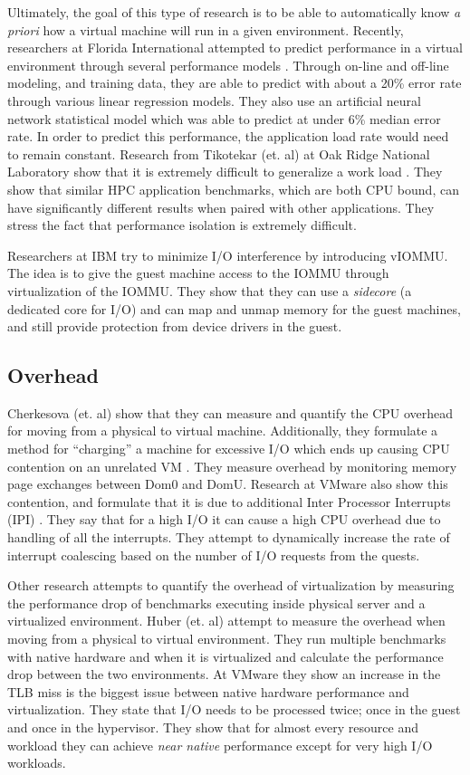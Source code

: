 Ultimately, the goal of this type of research is to be able to automatically know \emph{a priori} how a virtual machine will run in a given environment.  Recently, researchers at Florida International attempted to predict performance in a virtual environment through several performance models \cite{kundu}.  Through on-line and off-line modeling, and training data, they are able to predict with about a 20\% error rate through various linear regression models.  They also use an artificial neural network statistical model which was able to predict at under 6\% median error rate.   In order to predict this performance, the application load rate would need to remain constant.  Research from Tikotekar (et. al) at Oak Ridge National Laboratory show that it is extremely difficult to generalize a work load \cite{tikotekar}.  They show that similar HPC application benchmarks, which are both CPU bound, can have significantly different results when paired with other applications.  They stress the fact that performance isolation is extremely difficult.

Researchers at IBM \cite{amit} try to minimize I/O interference by introducing vIOMMU.  The idea is to give the guest machine access to the IOMMU through virtualization of the IOMMU.  They show that they can use a \emph{sidecore} (a dedicated core for I/O) and can map and unmap memory for the guest machines, and still provide protection from device drivers in the guest. 

\subsection{Overhead}
Cherkesova (et. al) show that they can measure and quantify the CPU overhead for moving from a physical to virtual machine.  Additionally, they formulate a method for “charging” a machine for excessive I/O which ends up causing CPU contention on an unrelated VM \cite{cherkasova}.  They measure overhead by monitoring memory page exchanges between Dom0 and DomU.  Research at VMware also show this contention, and formulate that it is due to additional Inter Processor Interrupts (IPI) \cite{ahmad}.   They say that for a high I/O it can cause a high CPU overhead due to handling of all the interrupts.  They attempt to dynamically increase the rate of interrupt coalescing based on the number of I/O requests from the quests.

Other research attempts to quantify the overhead of virtualization by measuring the performance drop of benchmarks executing inside physical server and a virtualized environment.  Huber (et. al) \cite{huber1} attempt to measure the overhead when moving from a physical to virtual environment.  They run multiple benchmarks with native hardware and when it is virtualized and calculate the performance drop between the two environments. At VMware \cite{buell1} they show an increase in the TLB miss is the biggest issue between native hardware performance and virtualization.  They state that I/O needs to be processed twice; once in the guest and once in the hypervisor.  They show that for almost every resource and workload they can achieve \emph{near native} performance except for very high I/O workloads.

